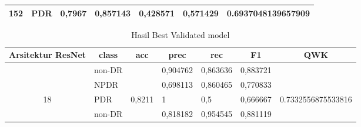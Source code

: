 \begin{table}[hbtp]
\begin{center}
\begin{tabular}{|c|l|c|l|l|l|c|}
        \multirow{-3}{*}{152} & PDR                                                & \multirow{-3}{*}{0,7967} & 0,857143                                          & 0,428571                                         & 0,571429                                        & \multirow{-3}{*}{0.6937048139657909} \\ \hline
        \end{tabular}
        \end{center}
    \end{table}
    \begin{table}[hbtp]
        \begin{center}
        \caption{Hasil Best Validated model}
        \label{tb:HasilValDefault}
        \begin{tabular}{|c|l|c|l|l|l|c|}
            \hline
            \rowcolor[HTML]{C0C0C0} 
            Arsitektur ResNet   & \multicolumn{1}{c|}{\cellcolor[HTML]{C0C0C0}class} & acc                      & \multicolumn{1}{c|}{\cellcolor[HTML]{C0C0C0}prec} & \multicolumn{1}{c|}{\cellcolor[HTML]{C0C0C0}rec} & \multicolumn{1}{c|}{\cellcolor[HTML]{C0C0C0}F1} & QWK                                  \\ \hline
                                  & non-DR                                             &                          & 0,904762                                          & 0,863636                                         & 0,883721                                        &                                      \\ \cline{2-2} \cline{4-6}
                                  & NPDR                                               &                          & 0,698113                                          & 0,860465                                         & 0,770833                                        &                                      \\ \cline{2-2} \cline{4-6}
            \multirow{-3}{*}{18}  & PDR                                                & \multirow{-3}{*}{0,8211} & 1                                                 & 0,5                                              & 0,666667                                        & \multirow{-3}{*}{0.7332556875533816} \\ \hline
                                  & non-DR                                             &                          & 0,818182                                          & 0,954545                                         & 0,881119                                        &                                      \\ \cline{2-2} \cline{4-6}

\end{tabular}
\end{center}
\end{table}
